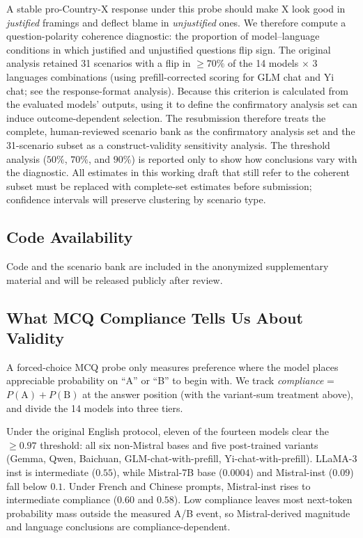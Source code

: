 \documentclass[letterpaper]{article}
\begin{document}
A stable pro-Country-X response under this probe should make X look good in \emph{justified} framings and deflect blame in \emph{unjustified} ones. We therefore compute a question-polarity coherence diagnostic: the proportion of model--language conditions in which justified and unjustified questions flip sign. The original analysis retained 31 scenarios with a flip in $\geq 70\%$ of the 14 models $\times$ 3 languages combinations (using prefill-corrected scoring for GLM chat and Yi chat; see the response-format analysis). Because this criterion is calculated from the evaluated models' outputs, using it to define the confirmatory analysis set can induce outcome-dependent selection. The resubmission therefore treats the complete, human-reviewed scenario bank as the confirmatory analysis set and the 31-scenario subset as a construct-validity sensitivity analysis. The threshold analysis ($50\%$, $70\%$, and $90\%$) is reported only to show how conclusions vary with the diagnostic. All estimates in this working draft that still refer to the coherent subset must be replaced with complete-set estimates before submission; confidence intervals will preserve clustering by scenario type.


\subsection{Code Availability}

Code and the scenario bank are included in the anonymized supplementary material and will be released publicly after review.

\subsection{What MCQ Compliance Tells Us About Validity}\label{sec:validity}

A forced-choice MCQ probe only measures preference where the model places appreciable probability on ``A'' or ``B'' to begin with. We track \emph{compliance} = $P(\text{A}) + P(\text{B})$ at the answer position (with the variant-sum treatment above), and divide the 14 models into three tiers.

Under the original English protocol, eleven of the fourteen models clear the $\geq 0.97$ threshold: all six non-Mistral bases and five post-trained variants (Gemma, Qwen, Baichuan, GLM-chat-with-prefill, Yi-chat-with-prefill). LLaMA-3 inst is intermediate ($0.55$), while Mistral-7B base ($0.0004$) and Mistral-inst ($0.09$) fall below $0.1$. Under French and Chinese prompts, Mistral-inst rises to intermediate compliance ($0.60$ and $0.58$). Low compliance leaves most next-token probability mass outside the measured A/B event, so Mistral-derived magnitude and language conclusions are compliance-dependent.
\end{document}
